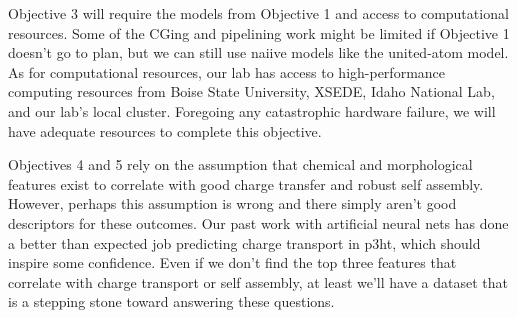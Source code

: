 Objective 3 will require the models from Objective 1 and access to computational resources.
Some of the CGing and pipelining work might be limited if Objective 1 doesn't go to plan, but we can still use naiive models like the united-atom model.
As for computational resources, our lab has access to high-performance computing resources from Boise State University, XSEDE, Idaho National Lab, and our lab's local cluster.
Foregoing any catastrophic hardware failure, we will have adequate resources to complete this objective.

Objectives 4 and 5 rely on the assumption that chemical and morphological features exist to correlate with good charge transfer and robust self assembly.
However, perhaps this assumption is wrong and there simply aren't good descriptors for these outcomes.
Our past work with artificial neural nets has done a better than expected job predicting charge transport in p3ht, which should inspire some confidence.
Even if we don't find the top three features that correlate with charge transport or self assembly, at least we'll have a dataset that is a stepping stone toward answering these questions.

\pagebreak
